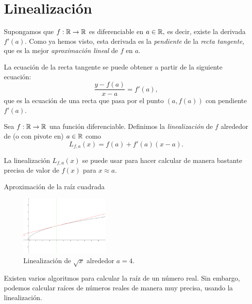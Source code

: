 
\section{Linealización}



    Supongamos que $f:\mathbb{R}\to\mathbb{R}$ es diferenciable en $a\in\mathbb{R},$ es decir, existe la derivada $f'(a).$ Como ya hemos visto,
    esta derivada es la \emph{pendiente} de la \emph{recta tangente,} que es la mejor \emph{aproximación
        lineal} de $f$ en $a.$



    La ecuación de la recta tangente se puede obtener a partir de la siguiente ecuación:
    $$
    \dfrac{y-f(a)}{x-a}=f'(a),
    $$
    que es la ecuación de una recta que pasa por el punto $(a,f(a))$ con pendiente $f'(a).$



    \begin{definicion}
        Sea $f:\mathbb{R} \to \mathbb{R}$ una función diferenciable. Definimos la \emph{linealización} de $f$ alrededor de (o con pivote en)
        $a\in \mathbb{R}$ como
        $$
        L_{f,a}(x)=f(a)+f'(a)(x-a).
        $$
    \end{definicion}



    La linealización $L_{f,a}(x)$ se puede usar para hacer calcular de manera bastante precisa de valor de $f(x)$ para
    $x\approx a.$


{Aproximación de la raíz cuadrada}

    \begin{figure}
        \centering
        \includegraphics[height=3cm,keepaspectratio=true]{./calculo/sqrt-linear.png}
        \caption{Linealización de $\sqrt{x}$ alrededor $a=4.$}
        \label{fig:sqrt}
    \end{figure}



    Existen varios algoritmos para calcular la raíz de un número real. Sin embargo, podemos calcular raíces de números
    reales de manera muy precisa, usando la linealización.



